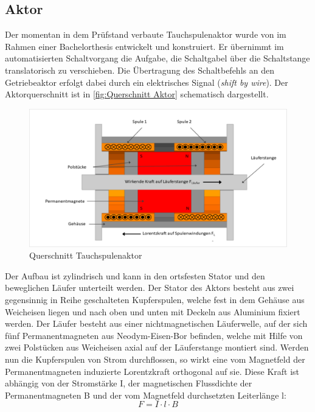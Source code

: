 \subsection{Aktor}

Der momentan in dem Prüfstand verbaute Tauchspulenaktor wurde von \cite{Hahn2018} im Rahmen einer Bachelorthesis entwickelt und konstruiert. Er übernimmt im automatisierten Schaltvorgang die Aufgabe, die Schaltgabel  über die Schaltstange translatorisch zu verschieben. Die Übertragung des Schaltbefehls an den Getriebeaktor erfolgt dabei durch ein elektrisches Signal (\textit{shift by wire}).
Der Aktorquerschnitt ist in \autoref{fig:Querschnitt Aktor} schematisch dargestellt.

\begin{figure}[h]
	\centering
		\includegraphics[width=0.9\columnwidth]{Bilder/QuerschnittAktordo.pdf}
	\caption{Querschnitt Tauchspulenaktor \cite[S.30]{Hahn2018}}
	\label{fig:Querschnitt Aktor}
\end{figure} \noindent
Der Aufbau ist zylindrisch und kann in den ortsfesten Stator und den beweglichen Läufer unterteilt werden. Der Stator des Aktors besteht aus zwei gegensinnig in Reihe geschalteten Kupferspulen, welche fest in dem Gehäuse aus Weicheisen liegen und nach oben und unten mit Deckeln aus Aluminium fixiert werden. Der Läufer besteht aus einer nichtmagnetischen Läuferwelle, auf der sich fünf Permanentmagneten aus Neodym-Eisen-Bor befinden, welche mit Hilfe von zwei Polstücken aus Weicheisen axial auf der Läuferstange montiert sind. 
Werden nun die Kupferspulen von Strom durchflossen, so wirkt eine vom Magnetfeld der Permanentmagneten induzierte Lorentzkraft orthogonal auf sie. Diese Kraft ist abhängig von der Stromstärke I, der magnetischen Flussdichte der Permanentmagneten B und der vom Magnetfeld durchsetzten Leiterlänge l:
\begin{equation}\label{eq:lorentz}
F=I\cdot l\cdot B
\end{equation}
